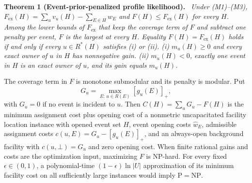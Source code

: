 \documentclass[10pt]{article}
\newenvironment{result}[1]{\par\medskip\noindent\textbf{#1.}\ \itshape\ignorespaces}{\par\medskip}
\theoremstyle{plain}
\theoremstyle{remark}
\begin{document}
\begin{result}{Theorem 1 (Event-prior-penalized profile likelihood)}
Under (M1)--(M3),
$F_{\mathrm{ex}}(H)=\sum_u v_u(H)-\sum_{E\in H}w_E$ and $F(H)\le F_{\mathrm{ex}}(H)$ for every $H$. Among the lower bounds of $F_{\mathrm{ex}}$ that keep the coverage term of $F$ and subtract one penalty per event, $F$ is the largest at every $H$. Equality $F(H)=F_{\mathrm{ex}}(H)$ holds if and only if every $u\in R^*(H)$ satisfies (i) or (ii). (i) $m_u(H)\ge0$ and every exact owner of $u$ in $H$ has nonnegative gain. (ii) $m_u(H)<0$, exactly one event in $H$ is an exact owner of $u$, and its gain equals $m_u(H)$.

The coverage term in $F$ is monotone submodular and its penalty is modular. Put
\[
G_u=\max_{E:\,u\in R(E)}[g_u(E)]_+,
\]
with $G_u=0$ if no event is incident to $u$. Then $C(H)=\sum_uG_u-F(H)$ is the minimum assignment cost plus opening cost of a nonmetric uncapacitated facility location instance with opened event set $H$, event opening costs $\hat w_E$, admissible assignment costs $c(u,E)=G_u-[g_u(E)]_+$, and an always-open background facility with $c(u,\bot)=G_u$ and zero opening cost. When finite rational gains and costs are the optimization input, maximizing $F$ is NP-hard. For every fixed $\epsilon\in(0,1)$, a polynomial-time $(1-\epsilon)\ln|U|$ approximation of its minimum facility cost on all sufficiently large instances would imply $\mathrm{P}=\mathrm{NP}$.
\end{result}
\end{document}
